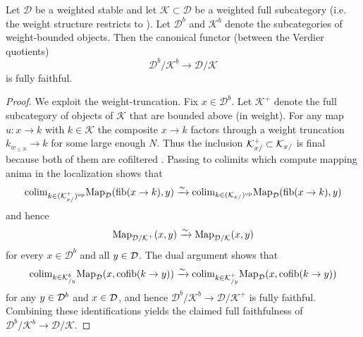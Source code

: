 \documentclass[a4paper,10pt, oneside]{amsart}
\begin{document}
\begin{lem}\label{calklem2}
	Let \(\mathcal{D}\) be a weighted stable \infcat and let \(\mathcal{K}\subset \mathcal{D}\) be a weighted full subcategory (i.e. the weight structure restricts to \mck). Let \(\mathcal{D}^b\) and \(\mathcal{K}^b\) denote the subcategories of weight-bounded objects. Then the canonical functor (between the Verdier quotients)
	\[
	\mathcal{D}^b/\mathcal{K}^b \longrightarrow \mathcal{D}/\mathcal{K}
	\]
	is fully faithful.
\end{lem}  

\begin{proof}
	We exploit the weight-truncation. Fix \(x\in\mathcal{D}^b\). %
	Let \(\mathcal{K}^+\) denote the full subcategory of objects of \(\mathcal{K}\) that are bounded above (in weight). For any map \(u\!:x\to k\) with \(k\in\mathcal{K}\) the composite \(x\to k\) factors through a weight truncation \(k_{w_{\leq N}}\to k\) for some large enough \(N\). Thus the inclusion  $\mathcal{K}^{+}_{x/}\subset \mathcal{K}_{x/}$ is final because both of them are cofiltered \infcats. Passing to colimits which compute mapping anima in the localization shows that
	$$
\mathrm{colim}_{k \in (\mathcal{K}^{+}_{x/})^{\mathrm{op}}} \text{Map}_{\mathcal{D}}(\text{fib}(x \to k), y)\xrightarrow{\sim} \mathrm{colim}_{k \in (\mathcal{K}_{x/})^{\mathrm{op}}} \text{Map}_{\mathcal{D}}(\text{fib}(x \to k), y) $$ and hence
$$\operatorname{Map}_{\mathcal{D}/\mathcal{K}^{+}}(x,y)\xrightarrow{\sim}  \text{Map}_{\mathcal{D}/\mathcal{K}}(x, y)$$
	for every \(x\in\mathcal{D}^b\) and all \(y\in \mathcal{D}\). The dual argument shows that
	$$
	\mathrm{colim}_{k \in \mathcal{K}^{b}_{/y}} \text{Map}_{\mathcal{D}}(x, \mathrm{cofib}(k\to y))\xrightarrow{\sim}	\mathrm{colim}_{k \in \mathcal{K}^{+}_{/y}} \text{Map}_{\mathcal{D}}(x, \mathrm{cofib}(k\to y)) $$
	for any $y\in \mathcal{D}^b$ and $x\in\mathcal{D}$, and hence
	\(\mathcal{D}^b/\mathcal{K}^b\to\mathcal{D}/\mathcal{K}^+\) is fully faithful. Combining these identifications yields the claimed full faithfulness of
	\(\mathcal{D}^b/\mathcal{K}^b\to\mathcal{D}/\mathcal{K}\).
\end{proof}
\end{document}
